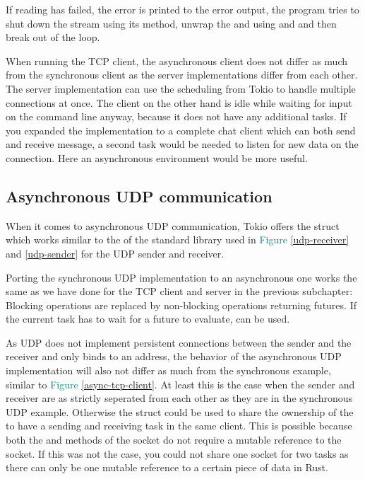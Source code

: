 If reading has failed, the error is printed to the error output, the program tries to shut down the stream using its
 method, unwrap the  and  using  and  and then break out
of the loop.

When running the TCP client, the asynchronous client does not differ as much from the synchronous client as the server
implementations differ from each other. The server implementation can use the scheduling from Tokio to handle multiple
connections at once. The client on the other hand is idle while waiting for input on the command line anyway, because
it does not have any additional tasks. If you expanded the implementation to a complete chat client which can both send
and receive message, a second task would be needed to listen for new data on the connection. Here an asynchronous
environment would be more useful.

\subsection{Asynchronous UDP communication}
When it comes to asynchronous UDP communication, Tokio offers the struct  which works
similar to the  of the standard library used in \textcolor{teal}{Figure \ref{udp-receiver}} and
\textcolor{teal}{\ref{udp-sender}} for the UDP sender and receiver.

Porting the synchronous UDP implementation to an asynchronous one works the same as we have done for the TCP client and
server in the previous subchapter: Blocking operations are replaced by non-blocking operations returning futures. If
the current task has to wait for a future to evaluate,  can be used.

As UDP does not implement persistent connections between the sender and the receiver and only binds to an address, the
behavior of the asynchronous UDP implementation will also not differ as much from the synchronous example, similar to
\textcolor{teal}{Figure \ref{async-tcp-client}}. At least this is the case when the sender and receiver are as strictly
seperated from each other as they are in the synchronous UDP example. Otherwise the struct  could
be used to share the ownership of the  to have a sending and receiving task in the same client. This is
possible because both the  and  methods of the socket do not require a mutable reference
to the socket. If this was not the case, you could not share one socket for two tasks as there can only be one mutable
reference to a certain piece of data in Rust.
